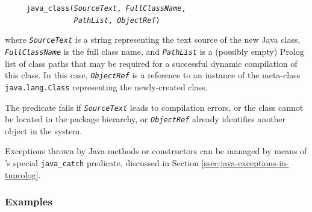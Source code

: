 \begin{description}
        \texttt{~~~~~java\_class(\textit{SourceText}, \textit{FullClassName},}\\
        \texttt{\mbox{~~~~~~~~~~~~~~~~}\textit{PathList}, \textit{ObjectRef})}

        where \texttt{\textit{SourceText}} is a string representing the text source of the new Java class, \texttt{\textit{FullClassName}} is the full class name, and \texttt{\textit{PathList}} is a (possibly empty) Prolog list of class paths that may be required for a successful dynamic compilation of this class.
        In this case, \texttt{\textit{ObjectRef}} is a reference to an instance of the meta-class \texttt{java.lang.Class} representing the newly-created class.

        The predicate fails if \texttt{\textit{SourceText}} leads to compilation errors, or the class cannot be located in the package hierarchy, or \texttt{\textit{ObjectRef}} already identifies another object in the system.
\end{description}

\noindent Exceptions thrown by Java methods or constructors can be managed by means of \tuprolog{}'s special \texttt{java\_catch} %
predicate, discussed in Section \ref{ssec:java-exceptions-in-tuprolog}.

\subsubsection{Examples}

